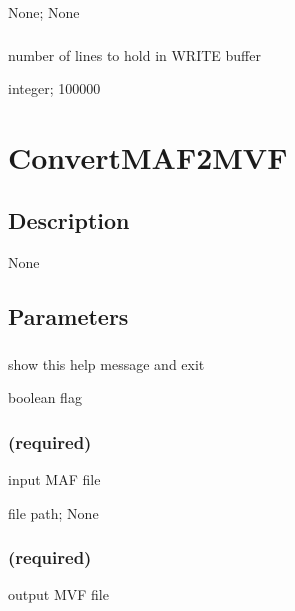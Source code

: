 \documentclass[letterpaper,11pt,english]{sphinxmanual}
\begin{document}
 None;  None


\subsubsection{}
\label{\detokenize{prog_desc:write-buffer-writebuffer}}
 number of lines to hold in WRITE buffer

 integer;  100000


\section{ConvertMAF2MVF}
\label{\detokenize{prog_desc:convertmaf2mvf}}

\subsection{Description}
\label{\detokenize{prog_desc:id6}}
None


\subsection{Parameters}
\label{\detokenize{prog_desc:id7}}

\subsubsection{}
\label{\detokenize{prog_desc:id8}}
 show this help message and exit

 boolean flag


\subsubsection{ (required)}
\label{\detokenize{prog_desc:maf-required}}
 input MAF file

 file path;  None


\subsubsection{ (required)}
\label{\detokenize{prog_desc:id9}}
 output MVF file
\end{document}
